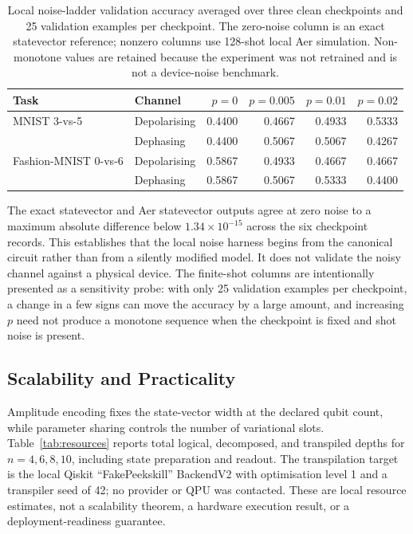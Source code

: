 \documentclass[conference]{IEEEtran}
\begin{document}
\begin{table}[!t]
\caption{Local noise-ladder validation accuracy averaged over three clean checkpoints and 25 validation examples per checkpoint. The zero-noise column is an exact statevector reference; nonzero columns use 128-shot local Aer simulation. Non-monotone values are retained because the experiment was not retrained and is not a device-noise benchmark.}
\label{tab:noise}
\centering
\small
\begin{tabular}{@{}llrrrr@{}}
\toprule
\textbf{Task} & \textbf{Channel} & \textbf{$p=0$} & \textbf{$p=0.005$} & \textbf{$p=0.01$} & \textbf{$p=0.02$} \\
\midrule
MNIST 3-vs-5 & Depolarising & 0.4400 & 0.4667 & 0.4933 & 0.5333 \\
 & Dephasing & 0.4400 & 0.5067 & 0.5067 & 0.4267 \\
Fashion-MNIST 0-vs-6 & Depolarising & 0.5867 & 0.4933 & 0.4667 & 0.4667 \\
 & Dephasing & 0.5867 & 0.5067 & 0.5333 & 0.4400 \\
\bottomrule
\end{tabular}
\end{table}

The exact statevector and Aer statevector outputs agree at zero noise to a
maximum absolute difference below $1.34\times10^{-15}$ across the six
checkpoint records. This establishes that the local noise harness begins from
the canonical circuit rather than from a silently modified model. It does not
validate the noisy channel against a physical device. The finite-shot columns
are intentionally presented as a sensitivity probe: with only 25 validation
examples per checkpoint, a change in a few signs can move the accuracy by a
large amount, and increasing $p$ need not produce a monotone sequence when the
checkpoint is fixed and shot noise is present.

\subsection{Scalability and Practicality}
Amplitude encoding fixes the state-vector width at the declared qubit count, while parameter sharing controls the number of variational slots. Table~\ref{tab:resources} reports total logical, decomposed, and transpiled depths for $n=4,6,8,10$, including state preparation and readout. The transpilation target is the local Qiskit ``FakePeekskill'' BackendV2 with optimisation level 1 and a transpiler seed of 42; no provider or QPU was contacted. These are local resource estimates, not a scalability theorem, a hardware execution result, or a deployment-readiness guarantee.
\end{document}
